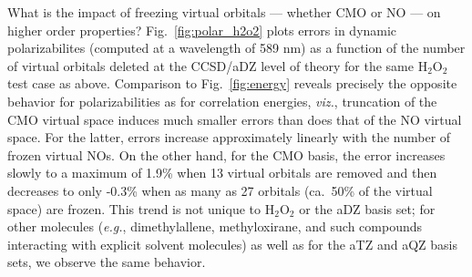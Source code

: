\documentclass[11pt,article]{achemso}
\begin{document}
What is the impact of freezing virtual orbitals --- whether CMO or NO --- on
higher order properties?  Fig.\ \ref{fig:polar_h2o2} plots errors in dynamic
polarizabilites (computed at a wavelength of 589 nm) as a function of the
number of virtual orbitals deleted at the CCSD/aDZ level of theory for the
same H$_2$O$_2$ test case as above.  Comparison to Fig.\ \ref{fig:energy}
reveals precisely the opposite behavior for polarizabilities as for
correlation energies, {\em viz.}, truncation of the CMO virtual space induces
much smaller errors than does that of the NO virtual space.  For the latter,
errors increase approximately linearly with the number of frozen virtual NOs.
On the other hand, for the CMO basis, the error increases slowly to a maximum
of 1.9\% when 13 virtual orbitals are removed and then decreases to only
-0.3\% when as many as 27 orbitals (ca.\ 50\% of the virtual space) are
frozen.  This trend is not unique to H$_2$O$_2$ or the aDZ basis set; for
other molecules ({\em e.g.}, dimethylallene, methyloxirane, and such compounds
interacting with explicit solvent molecules) as well as for the aTZ and aQZ
basis sets, we observe the same behavior.
\end{document}
